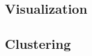 \documentclass[a4paper]{article} %
\begin{document}
\subsection{Visualization}
\subsection{Clustering}







\end{document}
